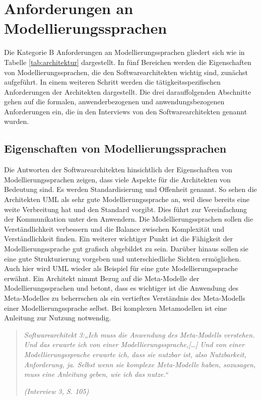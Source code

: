 \section{Anforderungen an Modellierungssprachen}

Die Kategorie B Anforderungen an Modellierungssprachen gliedert sich wie in Tabelle \ref{tab:architektur} dargestellt.
In fünf Bereichen werden die Eigenschaften von Modellierungssprachen, die den Softwarearchitekten wichtig sind, zunächst aufgeführt. In einem weiteren Schritt werden die tätigkeitsspezifischen Anforderungen der Architekten dargestellt. Die drei darauffolgenden Abschnitte gehen auf die formalen, anwenderbezogenen und anwendungsbezogenen Anforderungen ein, die in den Interviews von den Softwarearchitekten genannt wurden.

\subsection{Eigenschaften von Modellierungssprachen}

Die Antworten der Softwarearchitekten hinsichtlich der Eigenschaften von Modellierungssprachen zeigen, dass viele Aspekte für die Architekten von Bedeutung sind. Es werden Standardisierung und Offenheit genannt. So sehen die Architekten UML als sehr gute Modellierungssprache an, weil diese bereits eine weite Verbreitung hat und den Standard vorgibt. Dies führt zur Vereinfachung der Kommunikation unter den Anwendern.
Die Modellierungssprachen sollen die Verständlichkeit verbessern und die Balance zwischen Komplexität und Verständlichkeit finden. Ein weiterer wichtiger Punkt ist die Fähigkeit der Modellierungssprache gut grafisch abgebildet zu sein. Darüber hinaus sollen sie eine gute Strukturierung vorgeben und unterschiedliche Sichten ermöglichen. Auch hier wird UML wieder als Beispiel für eine gute Modellierungssprache erwähnt.
Ein Architekt nimmt Bezug auf die Meta-Modelle der Modellierungssprachen und betont, dass es wichtiger ist die Anwendung des Meta-Modelles zu beherrschen als ein vertieftes Verständnis des Meta-Modells einer Modellierungssprache selbst. Bei komplexen Metamodellen ist eine Anleitung zur Nutzung notwendig.

\begin{quote}
\textit{Softwarearchitekt 3:„Ich muss die Anwendung des Meta-Modells verstehen. Und das erwarte ich von einer Modellierungssprache,[…] Und von einer Modellierungssprache erwarte ich, dass sie nutzbar ist, also Nutzbarkeit, Anforderung, ja. Selbst wenn sie komplexe Meta-Modelle haben, sozusagen, muss eine Anleitung geben, wie ich das nutze.“}

\hfill \textit{(Interview 3, S. 105)}
\end{quote}

